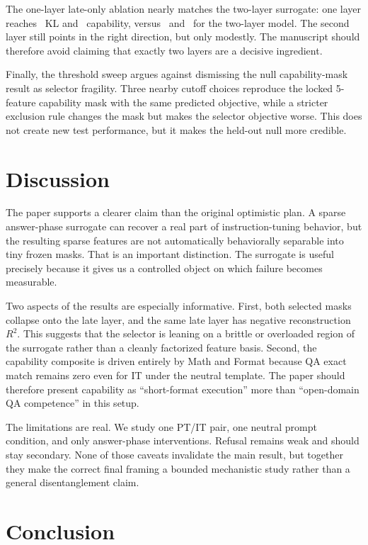 \documentclass[11pt]{article}
\begin{document}
The one-layer late-only ablation nearly matches the two-layer surrogate: one layer reaches \OneLayerKL\ KL and \OneLayerCap\ capability, versus \TwoLayerKL\ and \TwoLayerCap\ for the two-layer model. The second layer still points in the right direction, but only modestly. The manuscript should therefore avoid claiming that exactly two layers are a decisive ingredient.

Finally, the threshold sweep argues against dismissing the null capability-mask result as selector fragility. Three nearby cutoff choices reproduce the locked 5-feature capability mask with the same predicted objective, while a stricter exclusion rule changes the mask but makes the selector objective worse. This does not create new test performance, but it makes the held-out null more credible.

\section{Discussion}

The paper supports a clearer claim than the original optimistic plan. A sparse answer-phase surrogate can recover a real part of instruction-tuning behavior, but the resulting sparse features are not automatically behaviorally separable into tiny frozen masks. That is an important distinction. The surrogate is useful precisely because it gives us a controlled object on which failure becomes measurable.

Two aspects of the results are especially informative. First, both selected masks collapse onto the late layer, and the same late layer has negative reconstruction $R^2$. This suggests that the selector is leaning on a brittle or overloaded region of the surrogate rather than a cleanly factorized feature basis. Second, the capability composite is driven entirely by Math and Format because QA exact match remains zero even for IT under the neutral template. The paper should therefore present capability as ``short-format execution'' more than ``open-domain QA competence'' in this setup.

The limitations are real. We study one PT/IT pair, one neutral prompt condition, and only answer-phase interventions. Refusal remains weak and should stay secondary. None of those caveats invalidate the main result, but together they make the correct final framing a bounded mechanistic study rather than a general disentanglement claim.

\section{Conclusion}
\end{document}
